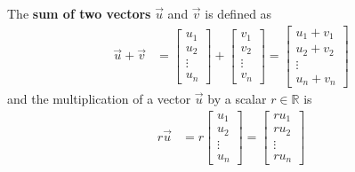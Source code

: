 The \textbf{sum of two vectors} $\vec{u}$ and $\vec{v}$ is defined as
%
\begin{align*}
\vec{u} + \vec{v} & = \begin{bmatrix}
u_1 \\ u_2 \\ \vdots \\ u_n
\end{bmatrix} + \begin{bmatrix}
v_1 \\ v_2 \\ \vdots \\ v_n
\end{bmatrix} = \begin{bmatrix}
u_1 + v_1 \\ u_2 + v_2 \\ \vdots \\ u_n + v_n
\end{bmatrix}
\end{align*}
%
and the multiplication of a vector $\vec{u}$ by a scalar $r \in \mathbb{R}$ is
%
\begin{align*}
r \vec{u} & = r  \begin{bmatrix}
u_1 \\ u_2 \\ \vdots \\ u_n
\end{bmatrix} = \begin{bmatrix}
r u_1 \\ r u_2 \\ \vdots \\r  u_n
\end{bmatrix}
\end{align*}


